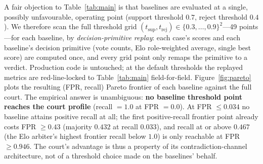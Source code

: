 \documentclass[11pt]{article}
\begin{document}
A fair objection to Table~\ref{tab:main} is that baselines are evaluated at
a single, possibly unfavourable, operating point (support threshold $0.7$,
reject threshold $0.4$). We therefore scan the full threshold grid
$(t_{\mathrm{sup}}, t_{\mathrm{rej}}) \in \{0.3, \dots, 0.9\}^2$---49
points---for each baseline, by \emph{decision-primitive replay}: each
case's scores and each baseline's decision primitive (vote counts, Elo
role-weighted average, single best score) are computed once, and every grid
point only remaps the primitive to a verdict. Production code is untouched;
at the default thresholds the replayed metrics are red-line-locked to
Table~\ref{tab:main} field-for-field. Figure~\ref{fig:pareto} plots the
resulting (FPR, recall) Pareto frontier of each baseline against the full
court. The empirical answer is unambiguous: \textbf{no baseline threshold
point reaches the court profile} (recall $=1.0$ at FPR $=0.0$). At FPR
$\le 0.034$ no baseline attains positive recall at all; the first
positive-recall frontier point already costs FPR $\ge 0.43$ (majority
$0.432$ at recall $0.033$), and recall at or above $0.467$ (the Elo
arbiter's highest frontier recall below $1.0$) is only reachable at FPR
$\ge 0.946$. The court's advantage
is thus a property of its contradiction-channel architecture, not of a
threshold choice made on the baselines' behalf.
\end{document}
